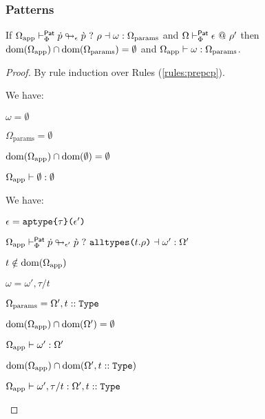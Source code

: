 \subsubsection{Patterns}
\begin{lemma}
\label{lemma:pattern-deparameterization-P}
If $\Omega_\text{app} \vdash_{\Phi}^\mathsf{Pat} \dot{p} \looparrowright_{\epsilon} \grave{p} ~?~ \rho \dashv \omega : \Omega_\text{params}$ and $\Omega \vdash_{\Phi}^{\mathsf{Pat}} \epsilon ~@~ \rho'$ then $\text{dom}(\Omega_\text{app}) \cap \text{dom}(\Omega_\text{params}) = \emptyset$ and $\Omega_\text{app} \vdash \omega : \Omega_\text{params}$.
\end{lemma}
\begin{proof} By rule induction over Rules (\ref{rules:prepcp}).
\begin{byCases}
  \item[\text{(\ref{rule:prepcp-ceexp})}] We have:
    \begin{pfsteps*}
      \item $\omega=\emptyset$ 
      \item $\Omega_\text{params}=\emptyset$ 
      \item $\text{dom}(\Omega_\text{app}) \cap \text{dom}(\emptyset) = \emptyset$ 
      \item $\Omega_\text{app} \vdash \emptyset : \emptyset$ 
    \end{pfsteps*}
    \resetpfcounter
  \item[\text{(\ref{rule:prepcp-alltypes})}] We have:
    \begin{pfsteps*}
      \item $\epsilon=\texttt{aptype}\texttt{\{}\tau\texttt{\}(}\epsilon'\texttt{)}$ 
      \item $\Omega_\text{app} \vdash_{\Phi}^\mathsf{Pat} \dot{p} \looparrowright_{\epsilon'} \grave{p} ~?~ \texttt{alltypes}\texttt{(}t.\rho\texttt{)} \dashv \omega' : \Omega'$  
      \item $t \notin \text{dom}(\Omega_\text{app})$  
      \item $\omega=\omega', \tau/t$ 
      \item $\Omega_\text{params} = \Omega', t :: \texttt{Type}$ 
      \item $\text{dom}(\Omega_\text{app}) \cap \text{dom}(\Omega') = \emptyset$  
      \item $\Omega_\text{app} \vdash \omega' : \Omega'$  
      \item $\text{dom}(\Omega_\text{app}) \cap \text{dom}(\Omega', t :: \texttt{Type})$ 
      \item $\Omega_\text{app} \vdash \omega', \tau/t : \Omega', t :: \texttt{Type}$ 
    \end{pfsteps*}
  \item[\text{(\ref{rule:prepcp-allmods})}] 
\end{byCases}
\end{proof}

